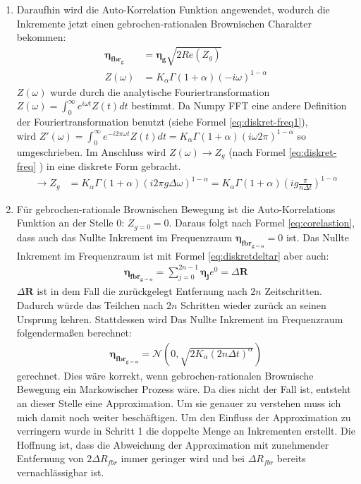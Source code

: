 \documentclass[
  a4paper,BCOR10mm,oneside,
  bibtotoc,idxtotoc,
  headsepline,footsepline,%
  fleqn,openbib
]{scrbook}
\begin{document}
\begin{enumerate}
 \item Daraufhin wird die Auto-Korrelation Funktion  angewendet, wodurch die Inkremente jetzt einen gebrochen-rationalen Brownischen Charakter bekommen: 
 \begin{align}
  \boldsymbol{\eta_{fbr_g}}&=\boldsymbol{\eta_g} \sqrt{2 Re(Z_g)} \label{eq:corelastion} \\
  Z(\omega)&= K_{\alpha} \Gamma(1+\alpha)( - i \omega)^{1-\alpha}
  \end{align}
  $Z(\omega)$ wurde durch die analytische Fouriertransformation $Z(\omega)=\int_0^{\infty}e^{i \omega t} Z(t) dt$ bestimmt. Da Numpy FFT eine andere Definition der Fouriertransformation  benutzt (siehe Formel \ref{eq:diskret-freq1}), \\ wird  $Z'(\omega)=\int_0^{\infty}e^{- i2 \pi \omega t} Z(t)dt= K_{\alpha} \Gamma(1+\alpha)(i \omega 2 \pi)^{1-\alpha}$ so umgeschrieben. Im Anschluss wird $Z(\omega) \longrightarrow Z_g$ (nach Formel \ref{eq:diskret-freq} ) in eine diskrete Form gebracht.
  \begin{align}
  \longrightarrow Z_g&= K_{\alpha} \Gamma(1+\alpha)(i 2 \pi g \Delta \omega)^{1-\alpha} =  K_{\alpha} \Gamma(1+\alpha)(i g \frac{ \pi}{n \Delta t})^{1-\alpha} 
 \end{align}
 \item Für gebrochen-rationale Brownischen Bewegung ist die Auto-Korrelations Funktion  an der Stelle 0: $Z_{g=0}=0$. Daraus folgt nach Formel \ref{eq:corelastion}, dass auch das Nullte Inkrement im Frequenzraum $\boldsymbol{\eta_{fbr_{g=o}}}= 0$ ist. Das Nullte Inkrement im Frequenzraum ist mit Formel \ref{eq:diskretdeltar} aber auch:
 \begin{align}
  \boldsymbol{\eta_{fbr_{g=o}}} = \sum_{j=0}^{2n-1} \boldsymbol{\eta_j} e^{0}=\Delta  \boldsymbol{R} 
 \end{align}
$\Delta \boldsymbol{R} $ ist in dem Fall die zurückgelegt Entfernung nach $2n$ Zeitschritten.
Dadurch würde das Teilchen nach $2n$ Schritten wieder zurück an seinen Ursprung kehren. Stattdessen wird Das Nullte Inkrement im Frequenzraum folgendermaßen berechnet:
\begin{align}
\boldsymbol{\eta_{fbr_{g=o}}} = \mathcal{N}(0,\sqrt{2 K_{\alpha} (2n \Delta t)^\alpha})
\end{align}
 gerechnet. Dies wäre korrekt, wenn gebrochen-rationalen Brownische Bewegung ein Markowischer Prozess wäre. Da dies nicht der Fall ist, entsteht an dieser Stelle eine Approximation. Um sie genauer zu verstehen muss ich mich damit noch weiter beschäftigen. Um den Einfluss der Approximation zu verringern wurde in Schritt 1 die doppelte Menge an Inkrementen erstellt. Die Hoffnung ist, dass die Abweichung der Approximation  mit zunehmender Entfernung von $2 \Delta R_{fbr}$ immer geringer wird und bei $\Delta R_{fbr}$ bereits vernachlässigbar ist.

\end{enumerate}
\end{document}
